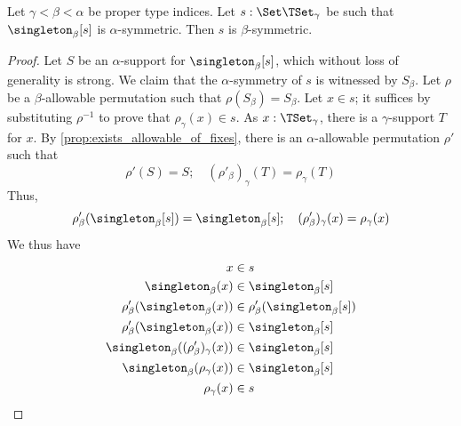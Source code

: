 \begin{proposition}
  \label{prop:singleton_union}
  Let \( \gamma < \beta < \alpha \) be proper type indices.
  Let \( s : \Set \TSet_\gamma \) be such that \( \singleton_\beta[s] \) is \( \alpha \)-symmetric.
  Then \( s \) is \( \beta \)-symmetric.
\end{proposition}
\begin{proof}
  Let \( S \) be an \( \alpha \)-support for \( \singleton_\beta[s] \), which without loss of generality is strong.
  We claim that the \( \alpha \)-symmetry of \( s \) is witnessed by \( S_\beta \).
  Let \( \rho \) be a \( \beta \)-allowable permutation such that \( \rho(S_\beta) = S_\beta \).
  Let \( x \in s \); it suffices by substituting \( \rho^{-1} \) to prove that \( \rho_\gamma(x) \in s \).
  As \( x : \TSet_\gamma \), there is a \( \gamma \)-support \( T \) for \( x \).
  By \cref{prop:exists_allowable_of_fixes}, there is an \( \alpha \)-allowable permutation \( \rho' \) such that
  \[ \rho'(S) = S;\quad (\rho'_\beta)_\gamma(T) = \rho_\gamma(T) \]
  Thus,
  \[ \rho'_\beta(\singleton_\beta[s]) = \singleton_\beta[s];\quad (\rho'_\beta)_\gamma(x) = \rho_\gamma(x) \]
  We thus have
  \begin{align*}
    x &\in s \\
    \singleton_\beta(x) &\in \singleton_\beta[s] \\
    \rho'_\beta(\singleton_\beta(x)) &\in \rho'_\beta(\singleton_\beta[s]) \\
    \rho'_\beta(\singleton_\beta(x)) &\in \singleton_\beta[s] \\
    \singleton_\beta((\rho'_\beta)_\gamma(x)) &\in \singleton_\beta[s] \\
    \singleton_\beta(\rho_\gamma(x)) &\in \singleton_\beta[s] \\
    \rho_\gamma(x) &\in s \\
  \end{align*}
\end{proof}
